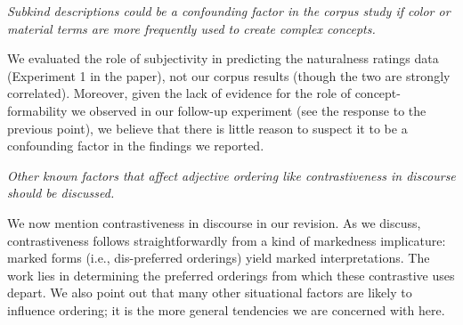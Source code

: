 \documentclass[12pt]{article}
\begin{document}


\item  \emph{Subkind descriptions could be a confounding factor in the corpus study if color or material terms are more frequently used to create complex concepts.}

We evaluated the role of subjectivity in predicting the naturalness ratings data (Experiment 1 in the paper), not our corpus results (though the two are strongly correlated). Moreover, given the lack of evidence for the role of concept-formability we observed in our follow-up experiment (see the response to the previous point), we believe that there is little reason to suspect it to be a confounding factor in the findings we reported. 



\item \emph{Other known factors that affect adjective ordering like contrastiveness in discourse should be discussed.}

We now mention contrastiveness in discourse in our revision. As we discuss, contrastiveness follows straightforwardly from a kind of markedness implicature: marked forms (i.e., dis-preferred orderings) yield marked interpretations. The work lies in determining the preferred orderings from which these contrastive uses depart.
We also point out that many other situational factors are likely to influence ordering; it is the more general tendencies we are concerned with here. %
\end{document}
